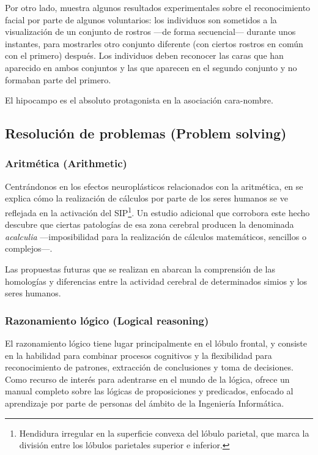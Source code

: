 Por otro lado, \cite{Trinkler2009} muestra algunos resultados experimentales sobre el reconocimiento facial por parte de algunos voluntarios: los individuos son sometidos a la visualización de un conjunto de rostros ---de forma secuencial--- durante unos instantes, para mostrarles otro conjunto diferente (con ciertos rostros en común con el primero) después. Los individuos deben reconocer las caras que han aparecido en ambos conjuntos y las que aparecen en el segundo conjunto y no formaban parte del primero.

El hipocampo es el absoluto protagonista en la asociación cara-nombre.

\subsection{Resolución de problemas (Problem solving)}
\label{sec::problem-solving}

\subsubsection{Aritmética (Arithmetic)}

Centrándonos en los efectos neuroplásticos relacionados con la aritmética, en \cite{Dehaene2004} se explica cómo la realización de cálculos por parte de los seres humanos se ve reflejada en la activación del \acf{SIP}\footnote{Hendidura irregular en la superficie convexa del lóbulo parietal, que marca la división entre los lóbulos parietales superior e inferior.}. Un estudio adicional que corrobora este hecho descubre que ciertas patologías de esa zona cerebral producen la denominada {\it acalculia} ---imposibilidad para la realización de cálculos matemáticos, sencillos o complejos---.

Las propuestas futuras que se realizan en \cite{Dehaene2004} abarcan la comprensión de las homologías y diferencias entre la actividad cerebral de determinados simios y los seres humanos.

\subsubsection{Razonamiento lógico (Logical reasoning)}

El razonamiento lógico tiene lugar principalmente en el lóbulo frontal, y consiste en la habilidad para combinar procesos cognitivos y la flexibilidad para reconocimiento de patrones, extracción de conclusiones y toma de decisiones. Como recurso de interés para adentrarse en el mundo de la lógica, \cite{JulianIranzo2004} ofrece un manual completo sobre las lógicas de proposiciones y predicados, enfocado al aprendizaje por parte de personas del ámbito de la Ingeniería Informática.

